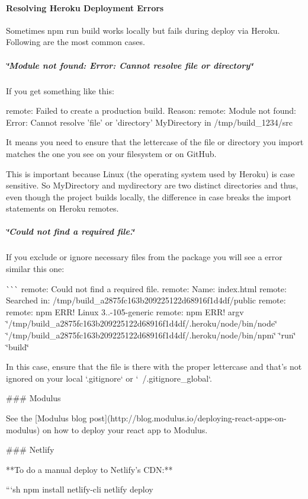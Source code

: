 \paragraph*{Resolving Heroku Deployment Errors}

Sometimes {\ttfamily npm run build} works locally but fails during deploy via Heroku. Following are the most common cases.

\subparagraph*{\char`\"{}\+Module not found\+: Error\+: Cannot resolve \textquotesingle{}file\textquotesingle{} or \textquotesingle{}directory\textquotesingle{}\char`\"{}}

If you get something like this\+:


\begin{DoxyCode}
remote: Failed to create a production build. Reason:
remote: Module not found: Error: Cannot resolve 'file' or 'directory'
MyDirectory in /tmp/build\_1234/src
\end{DoxyCode}


It means you need to ensure that the lettercase of the file or directory you {\ttfamily import} matches the one you see on your filesystem or on Git\+Hub.

This is important because Linux (the operating system used by Heroku) is case sensitive. So {\ttfamily My\+Directory} and {\ttfamily mydirectory} are two distinct directories and thus, even though the project builds locally, the difference in case breaks the {\ttfamily import} statements on Heroku remotes.

\subparagraph*{\char`\"{}\+Could not find a required file.\char`\"{}}

If you exclude or ignore necessary files from the package you will see a error similar this one\+:

\`{}\`{}\`{} remote\+: Could not find a required file. remote\+: Name\+: {\ttfamily index.\+html} remote\+: Searched in\+: /tmp/build\+\_\+a2875fc163b209225122d68916f1d4df/public remote\+: remote\+: npm E\+R\+R! Linux 3..-\/105-\/generic remote\+: npm E\+R\+R! argv \char`\"{}/tmp/build\+\_\+a2875fc163b209225122d68916f1d4df/.\+heroku/node/bin/node\char`\"{} \char`\"{}/tmp/build\+\_\+a2875fc163b209225122d68916f1d4df/.\+heroku/node/bin/npm\char`\"{} \char`\"{}run\char`\"{} \char`\"{}build\char`\"{} 
\begin{DoxyCode}
In this case, ensure that the file is there with the proper lettercase and that’s not ignored on your local
       `.gitignore` or `~/.gitignore\_global`.

### Modulus

See the [Modulus blog post](http://blog.modulus.io/deploying-react-apps-on-modulus) on how to deploy your
       react app to Modulus.

### Netlify

**To do a manual deploy to Netlify’s CDN:**

```sh
npm install netlify-cli
netlify deploy
\end{DoxyCode}


